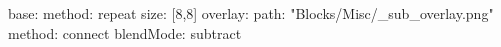 base:
  method: repeat
  size: [8,8]
overlay:
  path: "Blocks/Misc/_sub_overlay.png"
  method: connect
  blendMode: subtract